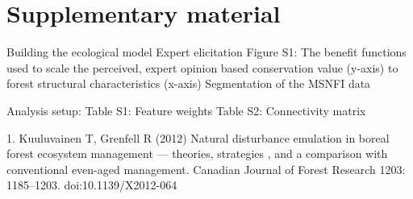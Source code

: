 \documentclass[]{article}
\begin{document}
\section{Supplementary material}

Building the ecological model Expert elicitation Figure S1: The benefit
functions used to scale the perceived, expert opinion based conservation
value (y-axis) to forest structural characteristics (x-axis)
Segmentation of the MSNFI data

Analysis setup: Table S1: Feature weights Table S2: Connectivity matrix

1. Kuuluvainen T, Grenfell R (2012) Natural disturbance emulation in
boreal forest ecosystem management --- theories, strategies , and a
comparison with conventional even-aged management. Canadian Journal of
Forest Research 1203: 1185--1203. doi:10.1139/X2012-064
\end{document}
